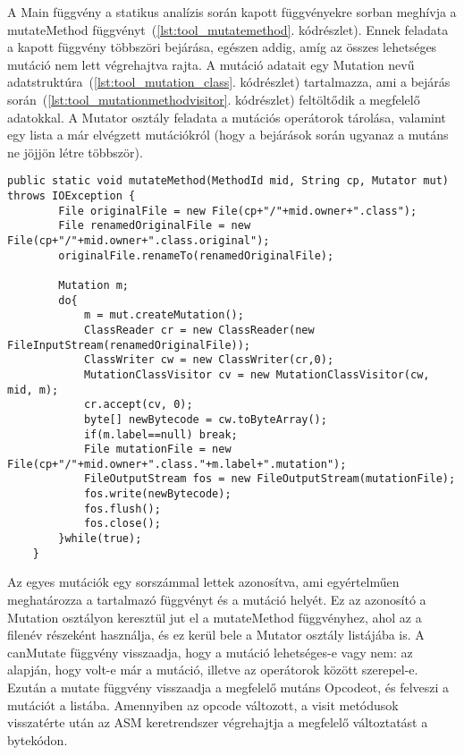A Main függvény a statikus analízis során kapott függvényekre sorban meghívja a mutateMethod függvényt~(\ref{lst:tool_mutatemethod}. kódrészlet). Ennek feladata a kapott függvény többszöri bejárása, egészen addig, amíg az összes lehetséges mutáció nem lett végrehajtva rajta. A mutáció adatait egy Mutation nevű adatstruktúra~(\ref{lst:tool_mutation_class}. kódrészlet) tartalmazza, ami a bejárás során~(\ref{lst:tool_mutationmethodvisitor}. kódrészlet) feltöltődik a megfelelő adatokkal. A Mutator osztály feladata a mutációs operátorok tárolása, valamint egy lista a már elvégzett mutációkról (hogy a bejárások során ugyanaz a mutáns ne jöjjön létre többször).
\begin{lstlisting}[frame=single,float=!ht,caption={Mutate Method},captionpos=b,label={lst:tool_mutatemethod}]
    public static void mutateMethod(MethodId mid, String cp, Mutator mut) throws IOException {
        File originalFile = new File(cp+"/"+mid.owner+".class");
        File renamedOriginalFile = new File(cp+"/"+mid.owner+".class.original");
        originalFile.renameTo(renamedOriginalFile);

        Mutation m;
        do{
            m = mut.createMutation();
            ClassReader cr = new ClassReader(new FileInputStream(renamedOriginalFile));
            ClassWriter cw = new ClassWriter(cr,0);
            MutationClassVisitor cv = new MutationClassVisitor(cw, mid, m);
            cr.accept(cv, 0);
            byte[] newBytecode = cw.toByteArray();
            if(m.label==null) break;
            File mutationFile = new File(cp+"/"+mid.owner+".class."+m.label+".mutation");
            FileOutputStream fos = new FileOutputStream(mutationFile);
            fos.write(newBytecode);
            fos.flush();
            fos.close();
        }while(true);
    }
\end{lstlisting}

Az egyes mutációk egy sorszámmal lettek azonosítva, ami egyértelműen meghatározza a tartalmazó függvényt és a mutáció helyét. Ez az azonosító a Mutation osztályon keresztül jut el a mutateMethod függvényhez, ahol az a filenév részeként használja, és ez kerül bele a Mutator osztály listájába is. A canMutate függvény visszaadja, hogy a mutáció lehetséges-e vagy nem: az alapján, hogy volt-e már a mutáció, illetve az operátorok között szerepel-e. Ezután a mutate függvény visszaadja a megfelelő mutáns Opcodeot, és felveszi a mutációt a listába. Amennyiben az opcode változott, a visit metódusok visszatérte után az ASM keretrendszer végrehajtja a megfelelő változtatást a bytekódon.

